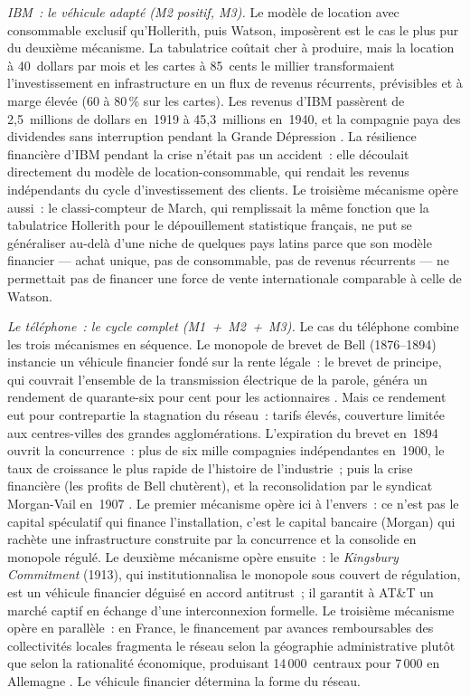 \emph{IBM~: le véhicule adapté (M2 positif, M3).} Le modèle de location avec consommable exclusif qu'Hollerith, puis Watson, imposèrent est le cas le plus pur du deuxième mécanisme. La tabulatrice coûtait cher à produire, mais la location à 40~dollars par mois et les cartes à 85~cents le millier transformaient l'investissement en infrastructure en un flux de revenus récurrents, prévisibles et à marge élevée (60 à 80\,\% sur les cartes). Les revenus d'IBM passèrent de 2,5~millions de dollars en~1919 à 45,3~millions en~1940, et la compagnie paya des dividendes sans interruption pendant la Grande Dépression \parencite{cortada_before_1993}. La résilience financière d'IBM pendant la crise n'était pas un accident~: elle découlait directement du modèle de location-consommable, qui rendait les revenus indépendants du cycle d'investissement des clients. Le troisième mécanisme opère aussi~: le classi-compteur de March, qui remplissait la même fonction que la tabulatrice Hollerith pour le dépouillement statistique français, ne put se généraliser au-delà d'une niche de quelques pays latins parce que son modèle financier --- achat unique, pas de consommable, pas de revenus récurrents --- ne permettait pas de financer une force de vente internationale comparable à celle de Watson.

\emph{Le téléphone~: le cycle complet (M1~+~M2~+~M3).} Le cas du téléphone combine les trois mécanismes en séquence. Le monopole de brevet de Bell (1876--1894) instancie un véhicule financier fondé sur la rente légale~: le brevet de principe, qui couvrait l'ensemble de la transmission électrique de la parole, généra un rendement de quarante-six pour cent pour les actionnaires \parencite{gabel_early_1969}. Mais ce rendement eut pour contrepartie la stagnation du réseau~: tarifs élevés, couverture limitée aux centres-villes des grandes agglomérations. L'expiration du brevet en~1894 ouvrit la concurrence~: plus de six mille compagnies indépendantes en~1900, le taux de croissance le plus rapide de l'histoire de l'industrie~; puis la crise financière (les profits de Bell chutèrent), et la reconsolidation par le syndicat Morgan-Vail en~1907 \parencite{mueller_universal_1993}. Le premier mécanisme opère ici à l'envers~: ce n'est pas le capital spéculatif qui finance l'installation, c'est le capital bancaire (Morgan) qui rachète une infrastructure construite par la concurrence et la consolide en monopole régulé. Le deuxième mécanisme opère ensuite~: le \emph{Kingsbury Commitment} (1913), qui institutionnalisa le monopole sous couvert de régulation, est un véhicule financier déguisé en accord antitrust~; il garantit à AT\&T un marché captif en échange d'une interconnexion formelle. Le troisième mécanisme opère en parallèle~: en France, le financement par \og avances remboursables\fg{} des collectivités locales fragmenta le réseau selon la géographie administrative plutôt que selon la rationalité économique, produisant 14\,000~centraux pour 7\,000 en Allemagne \parencite{bertho_histoire_1984}. Le véhicule financier détermina la forme du réseau.



